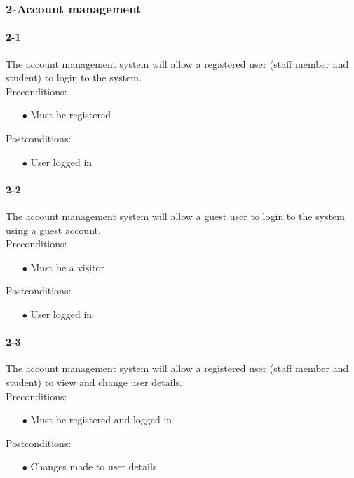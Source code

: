 \documentclass[a4paper,12pt]{article}
\begin{document}
\subsubsection{2-Account management}
\paragraph{2-1}
The account management system will allow a registered user (staff member and student) to login to the system.\\
Preconditions:
\begin{itemize}
	\item[$\bullet$] Must be registered
\end{itemize}
Postconditions:
\begin{itemize}
	\item[$\bullet$] User logged in
\end{itemize}
\paragraph{2-2}
The account management system will allow a guest user to login to the system using a guest account.\\
Preconditions:
\begin{itemize}
	\item[$\bullet$] Must be a visitor
\end{itemize}
Postconditions:
\begin{itemize}
	\item[$\bullet$] User logged in
\end{itemize}
\paragraph{2-3}
The account management system will allow a registered user (staff member and student) to view and change user details.\\
Preconditions:
\begin{itemize}
	\item[$\bullet$] Must be registered and logged in
\end{itemize}
Postconditions:
\begin{itemize}
	\item[$\bullet$] Changes made to user details
\end{itemize}
\end{document}
